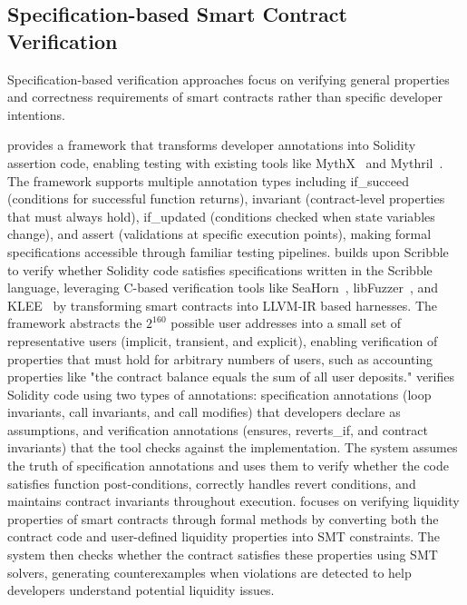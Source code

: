\documentclass[pdflatex,sn-basic]{sn-jnl}%
\theoremstyle{thmstyleone}%
\theoremstyle{thmstyletwo}%
\theoremstyle{thmstylethree}%
\begin{document}
\subsection{Specification-based Smart Contract Verification}
Specification-based verification approaches focus on verifying general properties and correctness requirements of smart contracts rather than specific developer intentions.

\citep{scribble} provides a framework that transforms developer annotations into Solidity assertion code,
enabling testing with existing tools like MythX~\citep{mythx} and Mythril~\citep{mythril}.
The framework supports multiple annotation types including if\_succeed (conditions for successful function returns),
invariant (contract-level properties that must always hold), if\_updated (conditions checked when state variables change),
and assert (validations at specific execution points), making formal specifications accessible through familiar testing pipelines.
\citep{smartace} builds upon Scribble~\citep{scribble} to verify whether Solidity code satisfies specifications written in the Scribble language,
leveraging C-based verification tools like SeaHorn~\citep{seahorn}, libFuzzer~\citep{libfuzzer}, and KLEE~\citep{klee} by transforming smart contracts into LLVM-IR based harnesses.
The framework abstracts the $2^{160}$ possible user addresses into a small set of representative users (implicit, transient, and explicit),
enabling verification of properties that must hold for arbitrary numbers of users, such as accounting properties like
"the contract balance equals the sum of all user deposits."
\citep{idealist} verifies Solidity code using two types of annotations: specification annotations (loop invariants, call invariants, and call modifies) that developers declare as assumptions,
and verification annotations (ensures, reverts\_if, and contract invariants) that the tool checks against the implementation.
The system assumes the truth of specification annotations and uses them to verify whether the code satisfies function post-conditions,
correctly handles revert conditions, and maintains contract invariants throughout execution.
\citep{solvent} focuses on verifying liquidity properties of smart contracts through formal methods
by converting both the contract code and user-defined liquidity properties into SMT constraints.
The system then checks whether the contract satisfies these properties using SMT solvers,
generating counterexamples when violations are detected to help developers understand potential liquidity issues.
\end{document}
